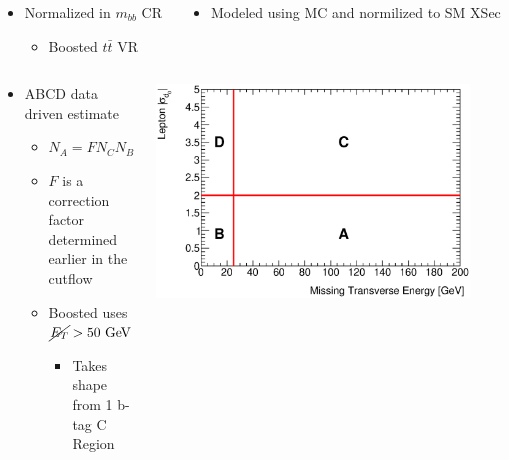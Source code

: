 \documentclass{beamer}
\newcommand*{\ttbar}{\ensuremath{t\bar{t}}\xspace}
\newcommand*{\met}{\ensuremath{\cancel{E_{T}}}\xspace}
\newcommand*{\header}[1]{\fontsize{16}{8}\selectfont \textbf{{\color{MyPurple}{#1}}}}
\begin{document}
\begin{frame}
\begin{center}
\header{Resolved Background Determination}
\end{center}
\begin{columns}
\begin{column}{0.5\textwidth}
\color{MyPurple}{\ttbar}
\begin{itemize}
\footnotesize
\item Normalized in $m_{bb}$ CR
\begin{itemize}
\scriptsize
\item Boosted \ttbar VR
\end{itemize}
\end{itemize}
\end{column}
\begin{column}{0.5\textwidth}
\color{MyPurple}{Other MC Bkg.}
\begin{itemize}
\footnotesize
\item Modeled using MC and normilized to SM XSec
\end{itemize}
\end{column}
\end{columns}
\begin{center}
\color{MyPurple}{QCD multi-jet background}
\end{center}
\begin{columns}
\begin{column}{0.5\textwidth}
\begin{itemize}
\vspace{-0.5cm}
\footnotesize
\item ABCD data driven estimate
\begin{itemize}
\item $N_A = F N_C N_B / N_D$
\item $F$ is a correction factor determined earlier in the cutflow
\item Boosted uses $\met>50\text{ GeV}$
\begin{itemize}
\scriptsize
\item Takes shape from 1 b-tag C Region
\end{itemize}
\end{itemize}
\end{itemize}
\end{column}
\begin{column}{0.5\textwidth}
\includegraphics[width=0.9\textwidth]{figures/abcdExample_met_vs_d0sigBL20}

\end{column}
\end{columns}
\end{frame}
\end{document}

